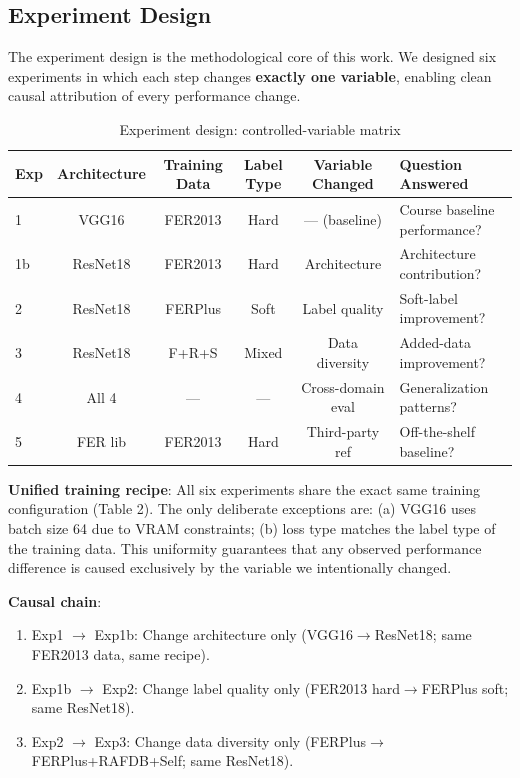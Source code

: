 \documentclass[12pt,a4paper]{article}
\begin{document}
\subsection{Experiment Design}

The experiment design is the methodological core of this work. We designed six experiments in which each step changes \textbf{exactly one variable}, enabling clean causal attribution of every performance change.

\begin{table}[H]
\centering
\caption{Experiment design: controlled-variable matrix}
\begin{tabular}{lccccl}
\toprule
Exp & Architecture & Training Data & Label Type & Variable Changed & Question Answered \\
\midrule
1  & VGG16    & FER2013    & Hard & --- (baseline)     & Course baseline performance? \\
1b & ResNet18 & FER2013    & Hard & Architecture       & Architecture contribution? \\
2  & ResNet18 & FERPlus    & Soft & Label quality      & Soft-label improvement? \\
3  & ResNet18 & F+R+S      & Mixed& Data diversity    & Added-data improvement? \\
4  & All 4    & ---        & ---  & Cross-domain eval  & Generalization patterns? \\
5  & FER lib  & FER2013    & Hard & Third-party ref    & Off-the-shelf baseline? \\
\bottomrule
\end{tabular}
\end{table}

\textbf{Unified training recipe}: All six experiments share the exact same training configuration (Table 2). The only deliberate exceptions are: (a) VGG16 uses batch size 64 due to VRAM constraints; (b) loss type matches the label type of the training data. This uniformity guarantees that any observed performance difference is caused exclusively by the variable we intentionally changed.

\textbf{Causal chain}:
\begin{enumerate}[label=Step \arabic*:, leftmargin=*]
    \item Exp1 $\to$ Exp1b: Change architecture only (VGG16$\to$ResNet18; same FER2013 data, same recipe).
    \item Exp1b $\to$ Exp2: Change label quality only (FER2013 hard$\to$FERPlus soft; same ResNet18).
    \item Exp2 $\to$ Exp3: Change data diversity only (FERPlus$\to$FERPlus+RAFDB+Self; same ResNet18).
\end{enumerate}
\end{document}
